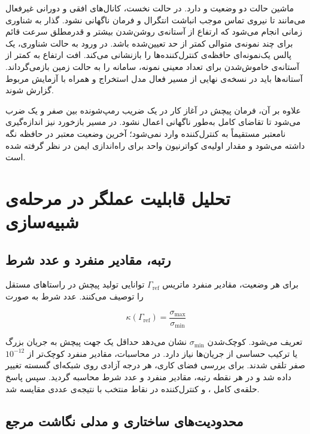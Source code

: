 ماشین حالت دو وضعیت  و  دارد. در حالت نخست، کانال‌های افقی و دورانی غیرفعال می‌مانند تا نیروی تماس موجب انباشت انتگرال و فرمان ناگهانی نشود. گذار به شناوری زمانی انجام می‌شود که ارتفاع از آستانه‌ی روشن‌شدن بیشتر و قدرمطلق سرعت قائم برای چند نمونه‌ی متوالی کمتر از حد تعیین‌شده باشد. در ورود به حالت شناوری، یک پالس یک‌نمونه‌ای حافظه‌ی کنترل‌کننده‌ها را بازنشانی می‌کند. افت ارتفاع به کمتر از آستانه‌ی خاموش‌شدن برای تعداد معینی نمونه، سامانه را به حالت زمین بازمی‌گرداند. آستانه‌ها باید در نسخه‌ی نهایی از مسیر فعال مدل استخراج و همراه با آزمایش مربوط گزارش شوند.

علاوه بر آن، فرمان پیچش در آغاز کار در یک ضریب رمپ‌شونده بین صفر و یک ضرب می‌شود تا تقاضای کامل به‌طور ناگهانی اعمال نشود. در مسیر بازخورد نیز اندازه‌گیری نامعتبر مستقیماً به کنترل‌کننده وارد نمی‌شود؛ آخرین وضعیت معتبر در حافظه نگه داشته می‌شود و مقدار اولیه‌ی کواترنیون واحد برای راه‌اندازی ایمن در نظر گرفته شده است.

\section{تحلیل قابلیت عملگر در مرحله‌ی شبیه‌سازی}
\label{sec:method-singularity}

\subsection{رتبه، مقادیر منفرد و عدد شرط}

برای هر وضعیت، مقادیر منفرد ماتریس $\Gamma_{\mathrm{ref}}$ توانایی تولید پیچش در راستاهای مستقل را توصیف می‌کنند. عدد شرط به صورت

\begin{equation}
	\kappa(\Gamma_{\mathrm{ref}})=\frac{\sigma_{\max}}{\sigma_{\min}}
	\label{eq:method-condition-number}
\end{equation}

تعریف می‌شود. کوچک‌شدن $\sigma_{\min}$ نشان می‌دهد حداقل یک جهت پیچش به جریان بزرگ یا ترکیب حساسی از جریان‌ها نیاز دارد. در محاسبات، مقادیر منفرد کوچک‌تر از $10^{-12}$ صفر تلقی شدند. برای بررسی فضای کاری، هر درجه آزادی روی شبکه‌ای گسسته تغییر داده شد و در هر نقطه رتبه، مقادیر منفرد و عدد شرط محاسبه گردید. سپس پاسخ حلقه‌ی کامل ،  و کنترل‌کننده در نقاط منتخب با نتیجه‌ی عددی مقایسه شد.

\subsection{محدودیت‌های ساختاری و مدلی نگاشت مرجع}

